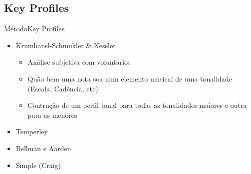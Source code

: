 \subsection{Key Profiles}
\begin{frame}{Método}{Key Profiles}
    \begin{itemize}
        \item Krumhansl-Schmukler \& Kessler
        \begin{itemize}
            \item Análise subjetiva com voluntários 
            \item Quão bem uma nota soa num elemento musical de uma tonalidade (Escala, Cadência, etc)
            \item Contrução de um perfil tonal para todas as tonalidades maiores e outra para as menores
        \end{itemize}
        \item Temperley
        \item Bellman e Aarden
        \item Simple (Craig)
    \end{itemize}
\end{frame}

